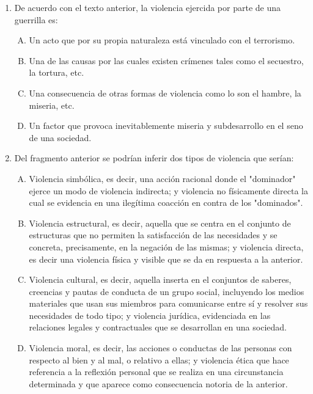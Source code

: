 \begin{enumerate}
\item De acuerdo con el texto anterior, la violencia ejercida por parte de una guerrilla es:\label{sociii-6}


\begin{enumerate}[(A)]
\item   Un acto que por su propia naturaleza está vinculado con el terrorismo.
 \item  Una de las causas por las cuales existen crímenes tales como el secuestro, la tortura, etc.
\item Una consecuencia de otras formas de violencia como lo son el hambre, la miseria, etc.
\item Un factor que provoca inevitablemente miseria y subdesarrollo en el seno de una sociedad.
\end{enumerate}



\item Del fragmento anterior se podrían inferir dos tipos de violencia que serían:\label{sociii-7}


\begin{enumerate}[(A)]
\item   Violencia simbólica, es decir, una acción racional donde el "dominador" ejerce un modo de violencia indirecta; y violencia no físicamente directa la cual se evidencia en una ilegítima coacción en contra de los "dominados".
 \item  Violencia estructural, es decir, aquella que se centra en el conjunto de estructuras que no permiten la satisfacción de las necesidades y se concreta, precisamente, en la negación de las mismas; y violencia directa, es decir una violencia física y visible que se da en respuesta a la anterior.
\item Violencia cultural, es decir, aquella inserta en el conjuntos de saberes, creencias y pautas de conducta de un grupo social, incluyendo los medios materiales que usan sus miembros para comunicarse entre sí y resolver sus necesidades de todo tipo; y violencia jurídica, evidenciada en las relaciones legales y contractuales que se desarrollan en una sociedad.
\item Violencia moral, es decir, las acciones o conductas de las personas con respecto al bien y al mal, o relativo a ellas; y violencia ética que hace referencia a la reflexión personal que se realiza en una circunstancia determinada y que aparece como consecuencia notoria de la anterior.
\end{enumerate}



\end{enumerate}
